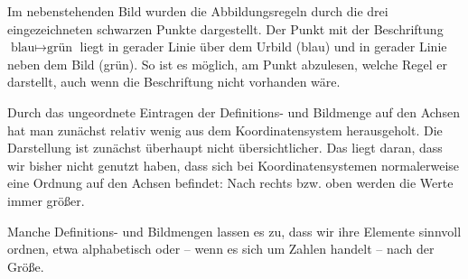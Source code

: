 \documentclass[../../main.tex]{subfiles}
\begin{document}
\begin{example}
    
    Im nebenstehenden Bild wurden die Abbildungsregeln durch die drei eingezeichneten schwarzen Punkte dargestellt. Der Punkt mit der Beschriftung $\text{blau}\mapsto\text{grün}$ liegt in gerader Linie über dem Urbild (blau) und in gerader Linie neben dem Bild (grün). So ist es möglich, am Punkt abzulesen, welche Regel er darstellt, auch wenn die Beschriftung nicht vorhanden wäre.
\end{example}

Durch das ungeordnete Eintragen der Definitions- und Bildmenge auf den Achsen hat man zunächst relativ wenig aus dem Koordinatensystem herausgeholt. Die Darstellung ist zunächst überhaupt nicht übersichtlicher. Das liegt daran, dass wir bisher nicht genutzt haben, dass sich bei Koordinatensystemen normalerweise eine Ordnung auf den Achsen befindet: Nach rechts bzw. oben werden die Werte immer größer.

Manche Definitions- und Bildmengen lassen es zu, dass wir ihre Elemente sinnvoll ordnen, etwa alphabetisch oder -- wenn es sich um Zahlen handelt -- nach der Größe.
\end{document}
